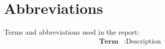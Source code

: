 \chapter*{Abbreviations}
Terms and abbreviations used in the report:
\begin{align*}
    \textbf{Term} &: \text{Description} \\
\end{align*}
